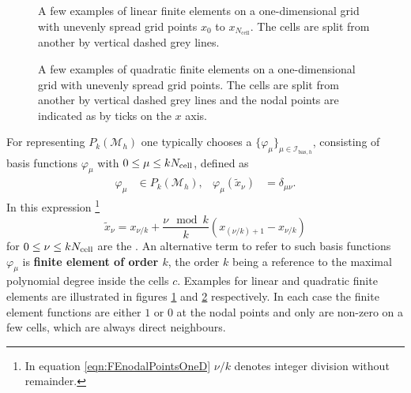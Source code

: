 \begin{figure}
	\centering
	\caption{
		A few examples of linear finite elements
		on a one-dimensional grid
		with unevenly spread grid points
		$x_0$ to $x_{N_\text{cell}}$.
		The cells are split from another
		by vertical dashed grey lines.
	}
	\label{fig:FEoneDimLin}
\end{figure}
\begin{figure}
	\centering
	\caption{
		A few examples of quadratic finite elements
		on a one-dimensional grid
		with unevenly spread grid points.
		The cells are split from another
		by vertical dashed grey lines
		and the nodal points are indicated as by ticks
		on the $x$ axis.
	}
	\label{fig:FEoneDimQuad}
\end{figure}
\newcommand{\Ibash}{\mathcal{I}_{\text{bas},h}}
For representing $P_k(\mathcal{M}_h)$
one typically chooses a  $\{\varphi_\mu\}_{\mu\in \Ibash}$,
consisting of basis functions $\varphi_\mu$ with $0 \leq \mu \leq k N_\text{cell}$,
defined as
\begin{align*}
	\varphi_\mu &\in P_k(\mathcal{M}_h), &
	\varphi_\mu(\tilde{x}_\nu) &= \delta_{\mu\nu}.
\end{align*}
In this expression%
\footnote{In equation \eqref{eqn:FEnodalPointsOneD} $\nu/k$ denotes integer division
without remainder.}
\begin{equation}
	\tilde{x}_\nu = x_{\nu/k} + \frac{\nu \!\! \mod k}{k} \left( x_{(\nu/k) +1} - x_{\nu/k} \right)
	\label{eqn:FEnodalPointsOneD}
\end{equation}
for $0 \leq \nu \leq k N_\text{cell}$ are the .
An alternative term to refer to such
basis functions $\varphi_\mu$
is \textbf{finite element of order $k$},
the order $k$ being a reference to the maximal polynomial degree inside the cells $c$.
Examples for linear and quadratic finite elements are
illustrated in figures \ref{fig:FEoneDimLin} and \ref{fig:FEoneDimQuad} respectively.
In each case the finite element functions
are either $1$ or $0$ at the nodal points and only
are non-zero on a few cells, which are always direct neighbours.

